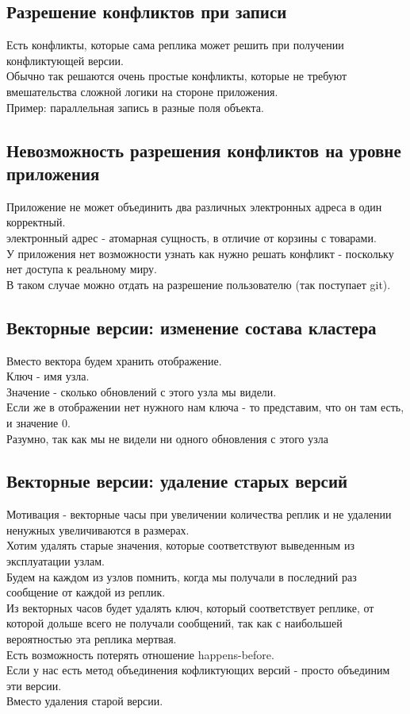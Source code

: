\subsection{Разрешение конфликтов при записи}
Есть конфликты, которые сама реплика может решить при получении конфликтующей версии.\\
Обычно так решаются очень простые конфликты, которые не требуют вмешательства сложной логики на стороне приложения.\\
Пример: параллельная запись в разные поля объекта.
\subsection{Невозможность разрешения конфликтов на уровне приложения}
Приложение не может объединить два различных электронных адреса в один корректный.\\
электронный адрес - атомарная сущность, в отличие от корзины с товарами.\\
У приложения нет возможности узнать как нужно решать конфликт - поскольку нет доступа к реальному миру.\\
В таком случае можно отдать на разрешение пользователю (так поступает git).
\subsection{Векторные версии: изменение состава кластера}
Вместо вектора будем хранить отображение.\\
Ключ - имя узла.\\
Значение - сколько обновлений с этого узла мы видели.\\
Если же в отображении нет нужного нам ключа - то представим, что он там есть, и значение $0$.\\
Разумно, так как мы не видели ни одного обновления с этого узла
\subsection{Векторные версии: удаление старых версий}
Мотивация - векторные часы при увеличении количества реплик и не удалении ненужных увеличиваются в размерах.\\
Хотим удалять старые значения, которые соответствуют выведенным из эксплуатации узлам.\\
Будем на каждом из узлов помнить, когда мы получали в последний раз сообщение от каждой из реплик.\\
Из векторных часов будет удалять ключ, который соответствует реплике, от которой дольше всего не получали сообщений, так как с наибольшей вероятностью эта реплика мертвая.\\
Есть возможность потерять отношение happens-before.\\
Если у нас есть метод объединения кофликтующих версий - просто объединим эти версии.\\
Вместо удаления старой версии.
